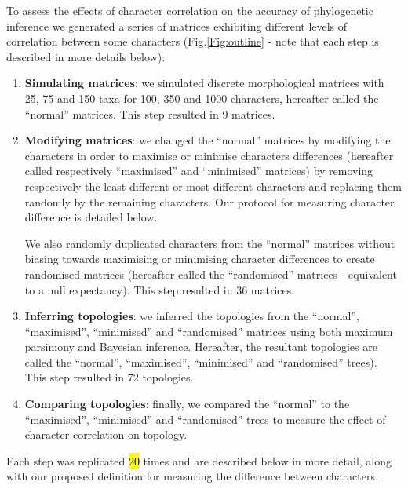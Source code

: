 \documentclass[12pt,letterpaper]{article}
\begin{document}
To assess the effects of character correlation on the accuracy of phylogenetic inference we generated a series of matrices exhibiting different levels of correlation between some characters (Fig.\ref{Fig:outline} - note that each step is described in more details below):
\begin{enumerate}
    \item \textbf{Simulating matrices}: we simulated discrete morphological matrices with 25, 75 and 150 taxa for 100, 350 and 1000 characters, hereafter called the ``normal'' matrices. This step resulted in 9 matrices.

    \item \textbf{Modifying matrices}: we changed the ``normal'' matrices by modifying the characters in order to maximise or minimise characters differences (hereafter called respectively ``maximised'' and ``minimised'' matrices) by removing respectively the least different or most different characters and replacing them randomly by the remaining characters. Our protocol for measuring character difference is detailed below.
 
    We also randomly duplicated characters from the ``normal'' matrices without biasing towards maximising or minimising character differences to create randomised matrices (hereafter called the ``randomised'' matrices - equivalent to a null expectancy). This step resulted in 36 matrices.

\item \textbf{Inferring topologies}: we inferred the topologies from the ``normal'', ``maximised'', ``minimised'' and ``randomised'' matrices using both maximum parsimony and Bayesian inference.
Hereafter, the resultant topologies are called the ``normal'', ``maximised'', ``minimised'' and ``randomised'' trees).
This step resulted in 72 topologies.
    \item \textbf{Comparing topologies}: finally, we compared the ``normal'' to the ``maximised'', ``minimised'' and ``randomised'' trees to measure the effect of character correlation on topology.
\end{enumerate}
Each step was replicated \hl{20} times and are described below in more detail, along with our proposed definition for measuring the difference between characters.
\end{document}
